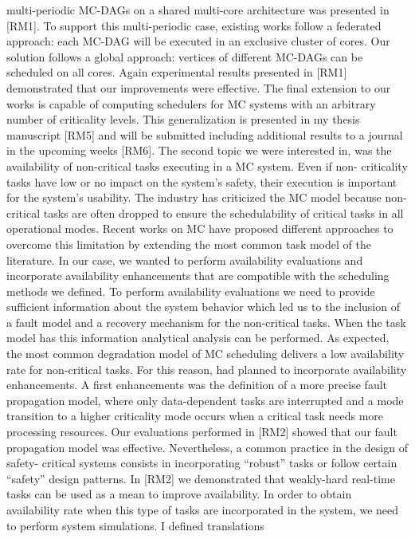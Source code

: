 \documentclass{article}
\begin{document}
multi-periodic MC-DAGs
on a shared multi-core architecture was presented in [RM1]. To support this multi-periodic case, existing 
works follow a
federated approach: each MC-DAG will be executed in an exclusive cluster of cores. Our solution follows a 
global approach:
vertices of different MC-DAGs can be scheduled on all cores. Again experimental results presented in [RM1] 
demonstrated
that our improvements were effective. The final extension to our works is capable of computing schedulers 
for MC systems
with an arbitrary number of criticality levels. This generalization is presented in my thesis manuscript [RM5] 
and will be
submitted including additional results to a journal in the upcoming weeks [RM6].
The second topic we were interested in, was the availability of non-critical tasks executing in a MC system. 
Even if non-
criticality tasks have low or no impact on the system’s safety, their execution is important for the system’s 
usability. The
industry has criticized the MC model because non-critical tasks are often dropped to ensure the 
schedulability of critical
tasks in all operational modes. Recent works on MC have proposed different approaches to overcome this 
limitation by
extending the most common task model of the literature. In our case, we wanted to perform availability 
evaluations and
incorporate availability enhancements that are compatible with the scheduling methods we defined. To 
perform availability
evaluations we need to provide sufficient information about the system behavior which led us to the inclusion 
of a fault
model and a recovery mechanism for the non-critical tasks. When the task model has this information 
analytical analysis
can be performed. As expected, the most common degradation model of MC scheduling delivers a low 
availability rate for
non-critical tasks. For this reason, had planned to incorporate availability enhancements. A first 
enhancements was the
definition of a more precise fault propagation model, where only data-dependent tasks are interrupted and 
a mode transition
to a higher criticality mode occurs when a critical task needs more processing resources. Our evaluations 
performed in
[RM2] showed that our fault propagation model was effective. Nevertheless, a common practice in the 
design of safety-
critical systems consists in incorporating “robust” tasks or follow certain “safety” design patterns. In [RM2] 
we demonstrated
that weakly-hard real-time tasks can be used as a mean to improve availability. In order to obtain availability 
rate when this
type of tasks are incorporated in the system, we need to perform system simulations. I defined translations 
\end{document}
